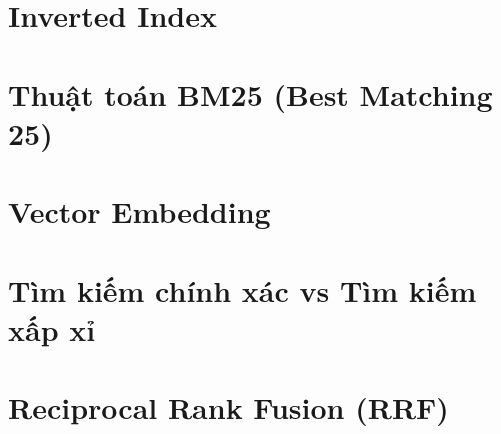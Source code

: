 \documentclass[letterpaper,12pt]{report}
\begin{document}
\section{Inverted Index}

\section{Thuật toán BM25 (Best Matching 25)}

\section{Vector Embedding}

\section{Tìm kiếm chính xác vs Tìm kiếm xấp xỉ}

\section{Reciprocal Rank Fusion (RRF)}
\end{document}
